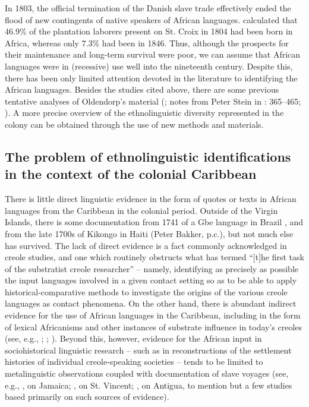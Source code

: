 \documentclass[output=paper,colorlinks,citecolor=brown]{langscibook}
\begin{document}
In 1803, the official termination of the Danish slave trade effectively ended the flood of new contingents of native speakers of African languages. \citet[48]{Asmussen_1983} calculated that 46.9\% of the plantation laborers present on St. Croix in 1804 had been born in Africa, whereas only 7.3\% had been in 1846. Thus, although the prospects for their maintenance and long-term survival were poor, we can assume that African languages were in (recessive) use well into the nineteenth century. Despite this, there has been only limited attention devoted in the literature to identifying the African languages. Besides the studies cited above, there are some previous tentative analyses of Oldendorp’s material (\cite{Fodor_1975}; notes from Peter Stein in \cite{Oldendorp_2000}: 365–465; \cite{Jones_2010}). A more precise overview of the ethnolinguistic diversity represented in the colony can be obtained through the use of new methods and materials.

\subsection{The problem of ethnolinguistic identifications in the context of the colonial Caribbean}

There is little direct linguistic evidence in the form of quotes or texts in African languages from the Caribbean in the colonial period. Outside of the Virgin Islands, there is some documentation from 1741 of a Gbe language in Brazil \citep{Peixoto_1944}, and from the late 1700s of Kikongo in Haiti (Peter Bakker, p.c.), but not much else has survived. The lack of direct evidence is a fact commonly acknowledged in creole studies, and one which routinely obstructs what \citet[2]{Kouwenberg_2008} has termed “[t]he first task of the substratist creole researcher” – namely, identifying as precisely as possible the input languages involved in a given contact setting so as to be able to apply historical-comparative methods to investigate the origins of the various creole languages as contact phenomena. On the other hand, there is abundant indirect evidence for the use of African languages in the Caribbean, including in the form of lexical Africanisms and other instances of substrate influence in today’s creoles (see, e.g., \cite{Parkvall_2000, Parkvall_2016}; \cite{Bartens_Baker_2012}; \cite{Muysken_Smith_Broges_2015}). Beyond this, however, evidence for the African input in sociohistorical linguistic research – such as in reconstructions of the settlement histories of individual creole-speaking societies – tends to be limited to metalinguistic observations coupled with documentation of slave voyages (see, e.g., \cite{Kouwenberg_2008}, on Jamaica; \cite{Prescod_Fraser_2015}, on St. Vincent; \cite{GalarzaBallester2016}, on Antigua, to mention but a few studies based primarily on such sources of evidence).
\end{document}
